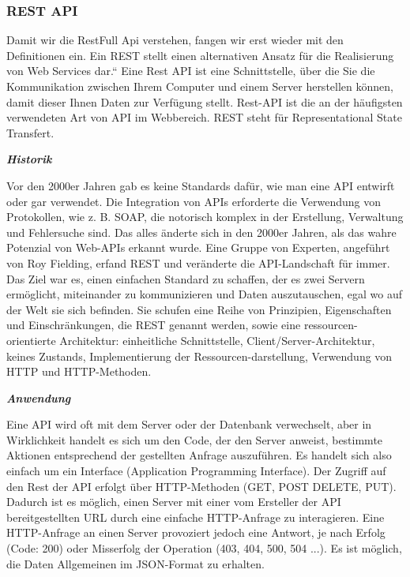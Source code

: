 \subsubsection{REST API}
Damit wir die RestFull Api verstehen, fangen wir erst wieder mit den Definitionen ein.
Ein REST stellt einen alternativen Ansatz für die Realisierung von Web Services dar.“ Eine Rest API ist eine Schnittstelle, über die Sie die Kommunikation zwischen Ihrem Computer und einem Server herstellen können, damit dieser Ihnen Daten zur Verfügung stellt. Rest-API ist die an der häufigsten verwendeten Art von API im Webbereich. REST steht für Representational State Transfert.\cite{alda}

\textit{\textbf{Historik}}

Vor den 2000er Jahren gab es keine Standards dafür, wie man eine API entwirft oder gar verwendet. Die Integration von APIs erforderte die Verwendung von Protokollen, wie z. B. SOAP, die notorisch komplex in der Erstellung, Verwaltung und Fehlersuche sind. Das alles änderte sich in den 2000er Jahren, als das wahre Potenzial von Web-APIs erkannt wurde. Eine Gruppe von Experten, angeführt von Roy Fielding, erfand REST und veränderte die API-Landschaft für immer.
Das Ziel war es, einen einfachen Standard zu schaffen, der es zwei Servern ermöglicht, miteinander zu kommunizieren und Daten auszutauschen, egal wo auf der Welt sie sich befinden. Sie schufen eine Reihe von Prinzipien, Eigenschaften und Einschränkungen, die REST genannt werden, sowie eine ressourcen-orientierte Architektur: einheitliche Schnittstelle, Client/Server-Architektur, keines Zustands, Implementierung der Ressourcen-darstellung, Verwendung von HTTP und HTTP-Methoden.

\textit{\textbf{Anwendung}}

Eine API wird oft mit dem Server oder der Datenbank verwechselt, aber in Wirklichkeit handelt es sich um den Code, der den Server anweist, bestimmte Aktionen entsprechend der gestellten Anfrage auszuführen. Es handelt sich also einfach um ein Interface (Application Programming Interface).
Der Zugriff auf den Rest der API erfolgt über HTTP-Methoden (GET, POST DELETE, PUT). Dadurch ist es möglich, einen Server mit einer vom Ersteller der API bereitgestellten URL durch eine einfache HTTP-Anfrage zu interagieren. Eine HTTP-Anfrage an einen Server provoziert jedoch eine Antwort, je nach Erfolg (Code: 200) oder Misserfolg der Operation (403, 404, 500, 504 ...). Es ist möglich, die Daten Allgemeinen im JSON-Format zu erhalten.

